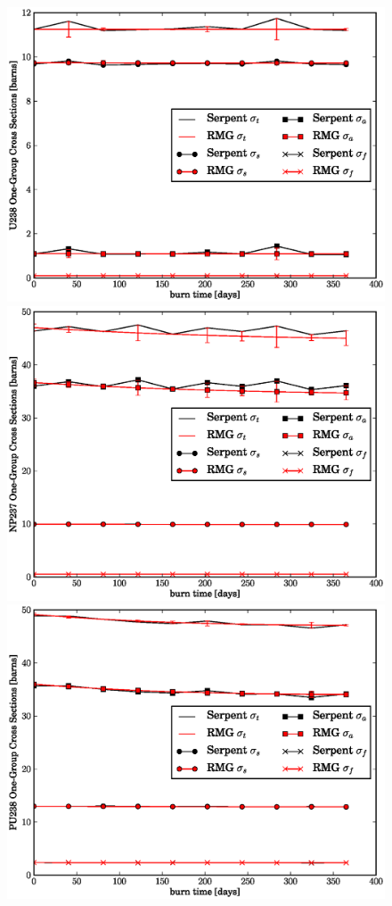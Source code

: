 \begin{figure}[htbp]
\begin{center}
\includegraphics[scale=0.3]{multigroup_method/figs/benchmark/U238_1g_xs.eps}
\includegraphics[scale=0.3]{multigroup_method/figs/benchmark/NP237_1g_xs.eps}
\includegraphics[scale=0.3]{multigroup_method/figs/benchmark/PU238_1g_xs.eps}

\end{center}
\end{figure}
